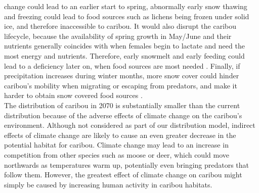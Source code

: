 \documentclass[twoside]{article}
\begin{document}
change could lead to an earlier start to spring, abnormally early snow
thawing and freezing could lead to food sources such as lichens being
frozen under solid ice, and therefore inaccessible to caribou. It would
also disrupt the caribou lifecycle, because the availability of spring
growth in May/June and their nutrients generally coincides with when
females begin to lactate and need the most energy and nutrients.
Therefore, early snowmelt and early feeding could lead to a deficiency
later on, when food sources are most needed \cite{jbrotton}. Finally,
if precipitation increases during winter months, more snow cover could
hinder caribou’s mobility when migrating or escaping from predators, and
make it harder to obtain snow covered food sources \cite{jbrotton}. \\
\indent The distribution of caribou in 2070 is substantially smaller
than the current distribution because of the adverse effects of climate
change on the caribou’s environment. Although not considered as part of
our distribution model, indirect effects of climate change are likely
to cause an even greater decrease in the potential habitat for caribou.
Climate change may lead to an increase in competition from other species
such as moose or deer, which could move northwards as temperatures warm up,
potentially even bringing predators that follow them. However, the greatest
effect of climate change on caribou might simply be caused by increasing
human activity in caribou habitats.

\small



\end{document}
